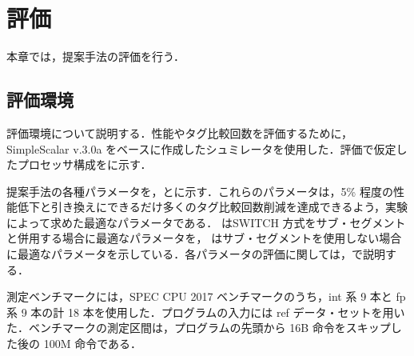 
\chapter{評価}
\label{sec:eval}
本章では，提案手法の評価を行う．


\section{評価環境}
\label{sec:eval_env}
評価環境について説明する．性能やタグ比較回数を評価するために，SimpleScalar v.3.0a をベースに作成したシュミレータを使用した．評価で仮定したプロセッサ構成をに示す．

提案手法の各種パラメータを，とに示す．これらのパラメータは，5\% 程度の性能低下と引き換えにできるだけ多くのタグ比較回数削減を達成できるよう，実験によって求めた最適なパラメータである． はSWITCH 方式をサブ・セグメントと併用する場合に最適なパラメータを， はサブ・セグメントを使用しない場合に最適なパラメータを示している．各パラメータの評価に関しては，で説明する．

測定ベンチマークには，SPEC CPU 2017 ベンチマークのうち，int 系 9 本と fp 系 9 本の計 18 本を使用した．プログラムの入力には ref データ・セットを用いた．ベンチマークの測定区間は，プログラムの先頭から 16B 命令をスキップした後の 100M 命令である．

